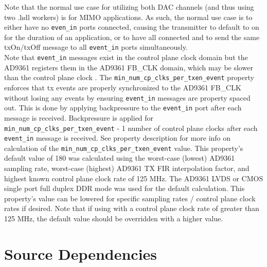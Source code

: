 Note that the normal use case for utilizing both DAC channels (and thus using two \comp.hdl workers) is for MIMO applications. As such, the normal use case is to either have no \verb+even_in+ ports connected, causing the transmitter to default to on for the duration of an application, or to have all connected and to send the same txOn/txOff message to all \verb+event_in+ ports simultaneously. \\

\pagebreak
\noindent Note that \verb+event_in+ messages exist in the control plane clock domain but the AD9361 registers them in the AD9361 FB\_CLK domain, which may be slower than the control plane clock . The \verb+min_num_cp_clks_per_txen_event+ property enforces that tx events are properly synchronized to the AD9361 FB\_CLK without losing any events by ensuring \verb+event_in+ messages are property spaced out. This is done by applying backpressure to the \verb+event_in+ port after each message is received. Backpressure is applied for \verb+min_num_cp_clks_per_txen_event+ - 1 number of control plane clocks after each \verb+event_in+ message is received. See property description for more info on calculation of the \verb+min_num_cp_clks_per_txen_event+ value. This property's default value of 180 was calculated using the worst-case (lowest) AD9361 sampling rate, worst-case (highest) AD9361 TX FIR interpolation factor, and highest known control plane clock rate of 125 MHz. The AD9361 LVDS or CMOS single port full duplex DDR mode was used for the default calculation. This property's value can be lowered for specific sampling rates / control plane clock rates if desired. Note that if using with a control plane clock rate of greater than 125 MHz, the default value should be overridden with a higher value.

\pagebreak


\section*{Source Dependencies}
